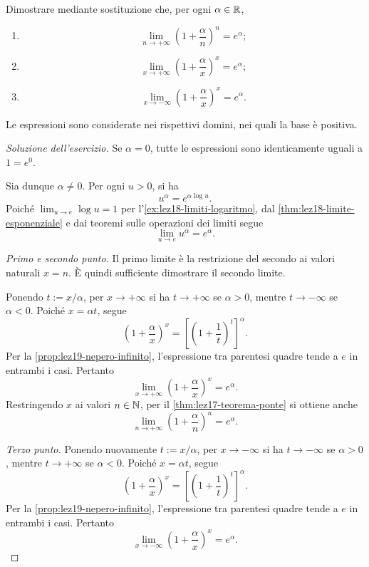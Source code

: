 \begin{exercise}
\label{ex:lez19-limiti-parametro}
Dimostrare mediante sostituzione che, per ogni
\(\alpha\in\mathbb{R}\),
\begin{enumerate}
  \item
  \[
    \lim_{n\to+\infty}
      \left(1+\frac\alpha n\right)^n=e^\alpha;
  \]
  \item
  \[
    \lim_{x\to+\infty}
      \left(1+\frac\alpha x\right)^x=e^\alpha;
  \]
  \item
  \[
    \lim_{x\to-\infty}
      \left(1+\frac\alpha x\right)^x=e^\alpha.
  \]
\end{enumerate}
Le espressioni sono considerate nei rispettivi domini,
nei quali la base è positiva.
\end{exercise}


\begin{proof}[Soluzione dell'esercizio]
Se \(\alpha=0\), tutte le espressioni sono
identicamente uguali a \(1=e^0\).

Sia dunque \(\alpha\ne0\). Per ogni \(u>0\), si ha
\[
  u^\alpha=e^{\alpha\log u}.
\]
Poiché \(\lim_{u\to e}\log u=1\) per
l'\cref{ex:lez18-limiti-logaritmo}, dal
\cref{thm:lez18-limite-esponenziale} e dai teoremi
sulle operazioni dei limiti segue
\[
  \lim_{u\to e}u^\alpha=e^\alpha.
\]

\emph{Primo e secondo punto.}
Il primo limite è la restrizione del secondo ai
valori naturali \(x=n\). È quindi sufficiente dimostrare
il secondo limite.

Ponendo \(t:=x/\alpha\), per \(x\to+\infty\)
si ha \(t\to+\infty\) se \(\alpha>0\),
mentre \(t\to-\infty\) se \(\alpha<0\).
Poiché \(x=\alpha t\), segue
\[
  \left(1+\frac\alpha x\right)^x
  =\left[\left(1+\frac1t\right)^t\right]^\alpha.
\]
Per la \cref{prop:lez19-nepero-infinito},
l'espressione tra parentesi quadre tende a \(e\)
in entrambi i casi. Pertanto
\[
  \lim_{x\to+\infty}
    \left(1+\frac\alpha x\right)^x=e^\alpha.
\]
Restringendo \(x\) ai valori \(n\in\mathbb{N}\), per il
\cref{thm:lez17-teorema-ponte} si ottiene anche
\[
  \lim_{n\to+\infty}
    \left(1+\frac\alpha n\right)^n=e^\alpha.
\]

\emph{Terzo punto.}
Ponendo nuovamente \(t:=x/\alpha\), per
\(x\to-\infty\) si ha \(t\to-\infty\) se
\(\alpha>0\), mentre \(t\to+\infty\) se
\(\alpha<0\). Poiché \(x=\alpha t\), segue
\[
  \left(1+\frac\alpha x\right)^x
  =\left[\left(1+\frac1t\right)^t\right]^\alpha.
\]
Per la \cref{prop:lez19-nepero-infinito},
l'espressione tra parentesi quadre tende a \(e\)
in entrambi i casi. Pertanto
\[
  \lim_{x\to-\infty}
    \left(1+\frac\alpha x\right)^x=e^\alpha.
\]
\end{proof}

